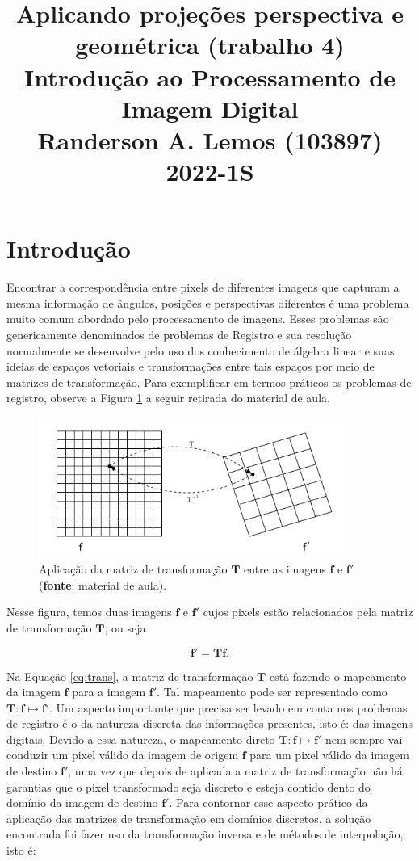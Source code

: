\documentclass{article}
\title{
	Aplicando projeções perspectiva e geométrica (trabalho 4) \\
	\Large Introdução ao Processamento de Imagem Digital \\
	Randerson A. Lemos (103897)
	2022-1S
}
\date{\vspace{-5ex}}
\begin{document}
  \maketitle

%
\section{Introdução}
Encontrar a correspondência entre pixels de diferentes imagens que capturam a mesma informação de ângulos, posições e perspectivas diferentes é uma problema muito comum abordado pelo processamento de imagens. Esses problemas são genericamente denominados de problemas de Registro e sua resolução normalmente se desenvolve pelo uso dos conhecimento de álgebra linear e suas ideias de espaços vetoriais e transformações entre tais espaços por meio de matrizes de transformação. Para exemplificar em termos práticos os problemas de registro, observe a Figura \ref{fig:trans} a seguir retirada do material de aula.

\begin{figure}[!htp]%
	\centering
	\includegraphics[width=10cm]{transformacao.png}
	\caption{Aplicação da matriz de transformação $\mathbf{T}$ entre as imagens $\mathbf{f}$ e $\mathbf{f'}$ (\textbf{fonte}: material de aula).}%
	\label{fig:trans}%
\end{figure}

\noindent
Nesse figura, temos duas imagens $\mathbf{f}$ e $\mathbf{f'}$ cujos pixels estão relacionados pela matriz de transformação $\mathbf{T}$, ou seja

\begin{equation}
\mathbf{f'} = \mathbf{T}\mathbf{f}.
\label{eq:trans}
\end{equation}

\noindent
Na Equação \ref{eq:trans}, a matriz de transformação $\mathbf{T}$ está fazendo o mapeamento da imagem $\mathbf{f}$ para a imagem $\mathbf{f'}$. Tal mapeamento pode ser representado como $\mathbf{T}: \mathbf{f} \mapsto \mathbf{f'}$. Um aspecto importante que precisa ser levado em conta nos problemas de registro é o da natureza discreta das informações presentes, isto é: das imagens digitais. Devido a essa natureza, o mapeamento direto $\mathbf{T}: \mathbf{f} \mapsto \mathbf{f'}$ nem sempre vai conduzir um pixel válido da imagem de origem $\mathbf{f}$ para um pixel válido da imagem de destino $\mathbf{f'}$, uma vez que depois de aplicada a matriz de transformação não há garantias que o pixel transformado seja discreto e esteja contido dento do domínio da imagem de destino $\mathbf{f'}$. Para contornar esse aspecto prático da aplicação das matrizes de transformação em domínios discretos, a solução encontrada foi fazer uso da transformação inversa e de métodos de interpolação, isto é:
\end{document}
